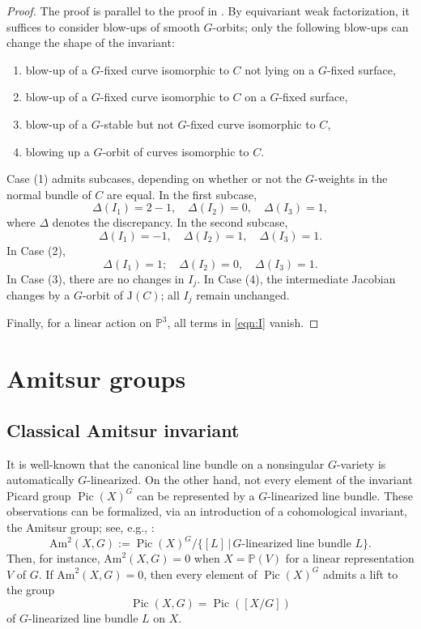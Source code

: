 \documentclass[12pt,reqno]{amsart}
\theoremstyle{plain}
\theoremstyle{remark}
\theoremstyle{definition}
\numberwithin{equation}{section}
\newcommand{\bP}{{\mathbb P}}
\newcommand{\Am}{\mathrm{Am}}
\DeclareMathOperator{\Pic}{Pic}
\begin{document}
\begin{proof}
The proof is parallel to the proof in \cite{CKK}. By equivariant weak factorization, it suffices to consider blow-ups of smooth $G$-orbits; only the following blow-ups can change the shape of the invariant: 
\begin{enumerate}
\item blow-up of a $G$-fixed curve isomorphic to $C$ not lying on a $G$-fixed surface, 
\item blow-up of a $G$-fixed curve isomorphic to $C$ on a $G$-fixed surface,
\item blow-up of a $G$-stable but not $G$-fixed curve isomorphic to $C$, 
\item blowing up a $G$-orbit of curves isomorphic to $C$. 
\end{enumerate}
Case (1) admits subcases, depending on whether or not the $G$-weights in the normal bundle of $C$ are equal. 
In the first subcase, 
$$
\Delta(I_1)=2-1,\quad \Delta(I_2)=0, \quad \Delta(I_3)=1,
$$
where $\Delta$ denotes the discrepancy.  
In the second subcase,  
$$
\Delta(I_1)=-1, \quad  \Delta(I_2)=1,\quad \Delta(I_3)=1. 
$$
In Case (2), 
$$
\Delta(I_1)=1; \quad \Delta(I_2)=0, \quad \Delta(I_3)=1.
$$
In Case (3), there are no changes in $I_j$. In Case (4), the intermediate Jacobian changes by a $G$-orbit of $\mathrm{J}(C)$; all $I_j$ remain unchanged. 

Finally, for a linear action on $\bP^3$, all terms in \eqref{eqn:I} vanish. 
\end{proof}




\section{Amitsur groups}
\label{sect:amitsur}


\subsection*{Classical Amitsur invariant}
It is well-known that the canonical line bundle on a nonsingular $G$-variety is automatically $G$-linearized. On the other hand, not every element of 
the invariant Picard group $\Pic(X)^G$ can be represented by a $G$-linearized line bundle.
These observations can be formalized, via an introduction of a cohomological invariant, the Amitsur group; 
see, e.g., \cite[App.\ A]{blancfinite}:
$$
\Am^2(X,G):=\Pic(X)^G/\{[L]\,|\,\text{$G$-linearized line bundle $L$}\}.
$$
Then, for instance,
$\Am^2(X,G)=0$ when $X=\bP(V)$ for a linear representation $V$ of $G$.
If $\Am^2(X,G)=0$, then every element of $\Pic(X)^G$ admits a lift to the group
\[ \Pic(X,G)=\Pic([X/G]) \]
of $G$-linearized line bundle $L$ on $X$.
\end{document}
